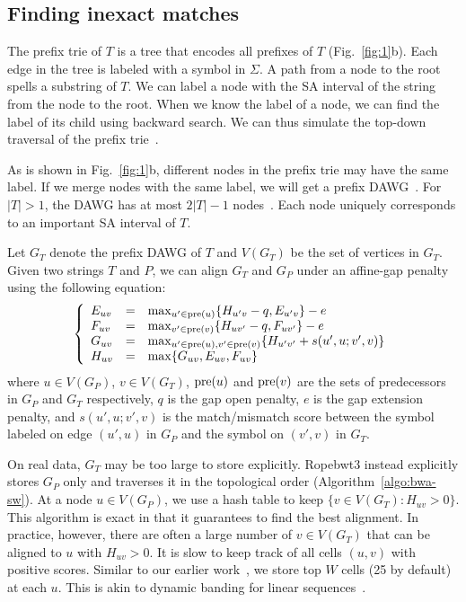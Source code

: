 \documentclass[webpdf,contemporary,large,namedate]{oup-authoring-template}%
\begin{document}
\subsection{Finding inexact matches}

The prefix trie of $T$ is a tree that encodes all prefixes of $T$ (Fig.~\ref{fig:1}b).
Each edge in the tree is labeled with a symbol in $\Sigma$.
A path from a node to the root spells a substring of $T$.
We can label a node with the SA interval of the string from the node to the root.
When we know the label of a node, we can find the label of its child using backward search.
We can thus simulate the top-down traversal of the prefix trie~\citep{Lam:2008aa}.

As is shown in Fig.~\ref{fig:1}b, different nodes in the prefix trie may have the same label.
If we merge nodes with the same label, we will get a prefix DAWG~\citep{DBLP:journals/eatcs/BlumerBEHM83,Li:2010fk}.
For $|T|>1$, the DAWG has at most $2|T|-1$ nodes~\citep{DBLP:conf/icalp/BlumerBEHM84}.
Each node uniquely corresponds to an important SA interval of $T$.

Let $G_T$ denote the prefix DAWG of $T$ and $V(G_T)$ be the set of vertices in $G_T$.
Given two strings $T$ and $P$, we can align $G_T$ and $G_P$ under an affine-gap penalty
using the following equation:
$$
\left\{\begin{array}{lll}
E_{uv}&=&\max_{u'\in{\rm pre}(u)}\{H_{u'v}-q,E_{u'v}\}-e\\
F_{uv}&=&\max_{v'\in{\rm pre}(v)}\{H_{uv'}-q,F_{uv'}\}-e\\
G_{uv}&=&\max_{u'\in{\rm pre}(u),v'\in{\rm pre}(v)}\{H_{u'v'}+s(u',u;v',v)\}\\
H_{uv}&=&\max\{G_{uv},E_{uv},F_{uv}\}\\
\end{array}\right.
$$
where $u\in V(G_P)$, $v\in V(G_T)$,
${\rm pre}(u)$ and ${\rm pre}(v)$ are the sets of predecessors in $G_P$ and $G_T$ respectively,
$q$ is the gap open penalty, $e$ is the gap extension penalty,
and $s(u',u;v',v)$ is the match/mismatch score between the symbol labeled on edge $(u',u)$ in $G_P$
and the symbol on $(v',v)$ in $G_T$.

On real data, $G_T$ may be too large to store explicitly.
Ropebwt3 instead explicitly stores $G_P$ only and traverses it in the topological order (Algorithm~\ref{algo:bwa-sw}).
At a node $u\in V(G_P)$, we use a hash table to keep $\{v\in V(G_T):H_{uv}>0\}$.
This algorithm is exact in that it guarantees to find the best alignment.
In practice, however, there are often a large number of $v\in V(G_T)$ that can be aligned to $u$ with $H_{uv}>0$.
It is slow to keep track of all cells $(u,v)$ with positive scores.
Similar to our earlier work~\citep{Li:2010fk}, we store top $W$ cells (25 by default) at each $u$.
This is akin to dynamic banding for linear sequences~\citep{Suzuki:2018aa}.
\end{document}

